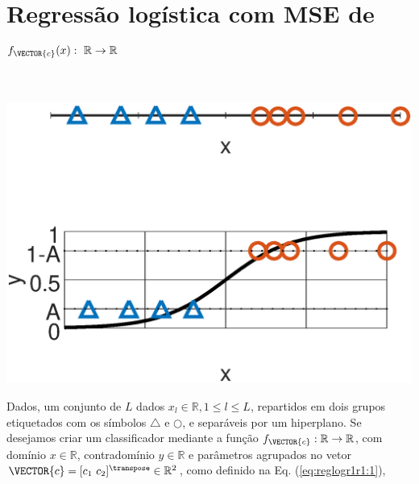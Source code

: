 \newpage

\section{Regressão logística com MSE de $f_{\VECTOR{c}}(x):~\mathbb{R} \rightarrow \mathbb{R}$}




\begin{theorem}\label{theo:reglogr1r1:1}
~\\
\noindent
\begin{minipage}{0.45\textwidth}
\centering
\includegraphics[width=0.95\linewidth]{chapters/classificacao/mfiles/reglogr1r1/reglogr1r1.eps} 
\end{minipage}
\begin{minipage}{0.55\textwidth}
Dados, um conjunto de $L$ dados $x_l \in \mathbb{R}, 1 \leq l \leq L$,
repartidos em dois grupos etiquetados com os símbolos $\bigtriangleup$ e $\bigcirc$, 
e separáveis por um hiperplano.
Se desejamos criar um classificador mediante 
a função  $f_{\VECTOR{c}}:\mathbb{R} \rightarrow \mathbb{R}$,
com domínio $x \in \mathbb{R}$, contradomínio $y \in \mathbb{R}$ e 
parâmetros agrupados no vetor $\VECTOR{c}=[c_1~ c_2]^{\transpose}\in \mathbb{R}^{2}$,
como definido na Eq. (\ref{eq:reglogr1r1:1}),
\begin{equation}\label{eq:reglogr1r1:1}

\end{equation}
\end{minipage}
\end{theorem}
